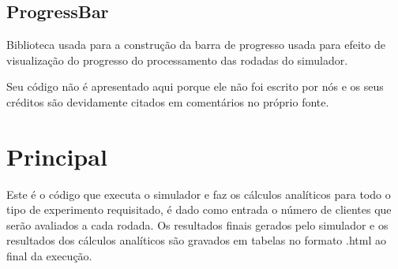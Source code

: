 \subsection{ProgressBar}
Biblioteca usada para a construção da barra de progresso usada para efeito de visualização do progresso do processamento das rodadas do simulador.

Seu código não é apresentado aqui porque ele não foi escrito por nós e os seus créditos são devidamente citados em comentários no próprio fonte.

\section{Principal}
Este é o código que executa o simulador e faz os cálculos analíticos para todo o tipo de experimento requisitado, é dado como entrada o número de clientes que serão avaliados a cada rodada. Os resultados finais gerados pelo simulador e os resultados dos cálculos analíticos são gravados em tabelas no formato .html ao final da execução.\\

